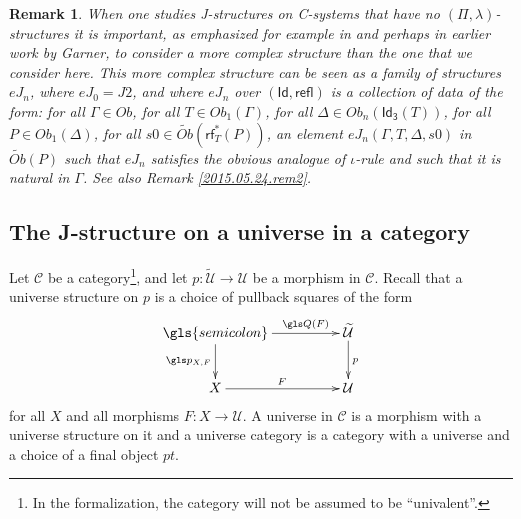 \documentclass[12pt]{article}
\numberwithin{equation}{section}
\newtheorem{remark}[proposition]{Remark}
\newcommand{\llabel}[1]{\label{#1}}
\newcommand{\sr}{\rightarrow}
\newcommand{\wt}{\widetilde}
\newcommand{\CC}{{\mathbb C}}  %
\newcommand{\C}{{\mathcal C}}  %
\newcommand{\Id}{\mathsf{Id}} %
\newcommand{\Idx}{\mathsf{Id_3}} %
\newcommand{\refl}{\mathsf{refl}}
\newcommand{\U}{\mathcal{U}}
\newcommand{\rf}{\mathsf{rf}}
\newcommand{\Obwt}{\wt{Ob}}
\begin{document}
%



%
\begin{remark}\rm
\llabel{2015.05.24.rem1} When one studies J-structures on C-systems that have
no $(\Pi,\lambda)$-structures it is important, as emphasized for example in
\cite{vandenBergGarner2011} and perhaps in earlier work by Garner,
to consider a more complex structure than the one
that we consider here. This more complex structure can be seen as a family of
structures $eJ_n$, where $eJ_0=J2$, and where $eJ_n$ over $(\Id,\refl)$ is a
collection of data of the form: for all $\Gamma\in Ob$, for all $T\in
Ob_1(\Gamma)$, for all $\Delta\in Ob_{n}(\Idx(T))$, for all $P\in
Ob_1(\Delta)$, for all $s0\in \Obwt(\rf_T^*(P))$, an element
$eJ_n(\Gamma,T,\Delta,s0)$ in $\Obwt(P)$ such that $eJ_n$ satisfies the
obvious analogue of $\iota$-rule and such that it is natural in $\Gamma$. See
also Remark \ref{2015.05.24.rem2}.
\end{remark}









\subsection{The J-structure on a universe in a category}
%
Let $\C$ be a category\footnote{In the formalization, the category will not be assumed to be ``univalent''.},
and let $p:\wt{\U}\sr \U$ be a morphism in
$\C$. Recall that a universe structure on $p$ is a choice of pullback
squares of the form
%
$$
\begin{xy}
          \xymatrix@C=4pc{ \gls{semicolon} \ar[r]^-{\gls Q(F)} \ar[d]_{\gls p_{X,F}} & \wt{\U}
            \ar[d]^{p}\\ X \ar[r]^{F} & \U }
\end{xy}
$$
%
for all $X$ and all morphisms $F:X\sr \U$. A universe in $\C$ is a
morphism with a universe structure on it and a universe category is a category
with a universe and a choice of a final object $pt$.
\end{document}
